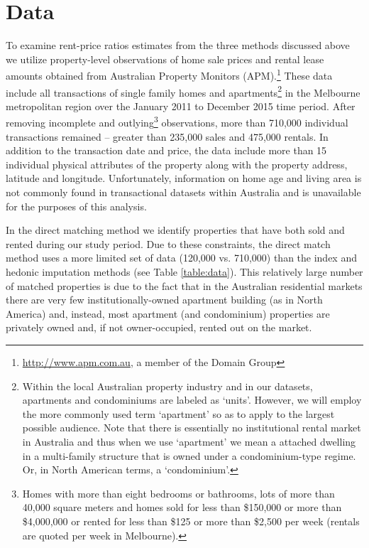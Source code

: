 \documentclass{article}\usepackage[]{graphicx}\usepackage[]{color}
\begin{document}
\section*{Data}
  
To examine rent-price ratios estimates from the three methods discussed above we utilize property-level observations of home sale prices and rental lease amounts obtained from Australian Property Monitors (APM).\footnote{{\color{blue} \href{http://www.apm.com.au}{http://www.apm.com.au}}, a member of the Domain Group}  These data include all transactions of single family homes and apartments\footnote{Within the local Australian property industry and in our datasets, apartments and condominiums are labeled as `units'. However, we will employ the more commonly used term `apartment' so as to apply to the largest possible audience. Note that there is essentially no institutional rental market in Australia and thus when we use `apartment' we mean a attached dwelling in a multi-family structure that is owned under a condominium-type regime. Or, in North American terms, a `condominium'.} in the Melbourne metropolitan region over the January 2011 to December 2015 time period.  After removing incomplete and outlying\footnote{Homes with more than eight bedrooms or bathrooms, lots of more than 40,000 square meters and homes sold for less than \$150,000 or more than \$4,000,000 or rented for less than \$125 or more than \$2,500 per week (rentals are quoted per week in Melbourne).} observations, more than 710,000 individual transactions remained -- greater than 235,000 sales and 475,000 rentals. In addition to the transaction date and price, the data include more than 15 individual physical attributes of the property along with the property address, latitude and longitude. Unfortunately, information on home age and living area is not commonly found in transactional datasets within Australia and is unavailable for the purposes of this analysis.\par
 
In the direct matching method we identify properties that have both sold and rented during our study period. Due to these constraints, the direct match method uses a more limited set of data (120,000 vs. 710,000) than the index and hedonic imputation methods (see Table \ref{table:data}).  This relatively large number of matched properties is due to the fact that in the Australian residential markets there are very few institutionally-owned apartment building (as in North America) and, instead, most apartment (and condominium) properties are privately owned and, if not owner-occupied, rented out on the market.\par 
\end{document}

